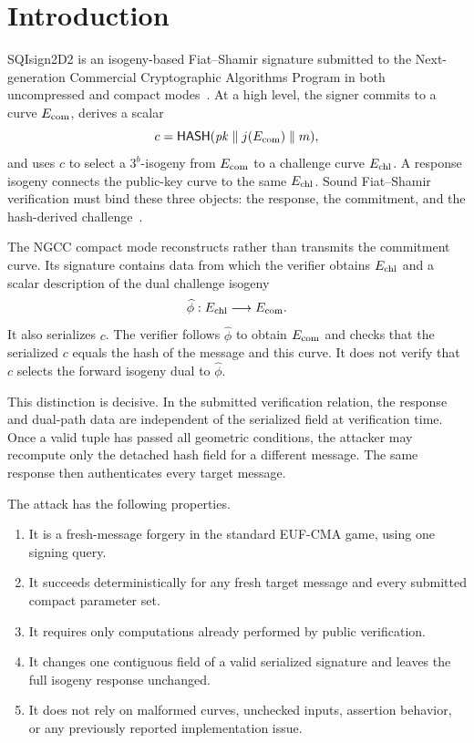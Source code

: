 \documentclass[11pt,a4paper]{article}
\newcommand{\Hash}{\mathsf{HASH}}
\begin{document}
\section{Introduction}

SQIsign2D2 is an isogeny-based Fiat--Shamir signature submitted to the
Next-generation Commercial Cryptographic Algorithms Program in both uncompressed and compact
modes~\cite{sqisign2d2-spec}.  At a high level, the signer
commits to a curve $E_{\rm com}$, derives a scalar
\[
  c=\Hash(\mathit{pk}\parallel j(E_{\rm com})\parallel m),
\]
and uses $c$ to select a $3^b$-isogeny from $E_{\rm com}$ to a challenge curve
$E_{\rm chl}$.  A response isogeny connects the public-key curve to the same
$E_{\rm chl}$.  Sound Fiat--Shamir verification must bind these three objects: the response,
the commitment, and the hash-derived challenge~\cite{fiat-shamir}.

The NGCC compact mode reconstructs rather than transmits the commitment curve.  Its signature
contains data from which the verifier obtains $E_{\rm chl}$ and a scalar description of the
dual challenge isogeny
\[
  \widehat\phi:E_{\rm chl}\longrightarrow E_{\rm com}.
\]
It also serializes $c$.  The verifier follows $\widehat\phi$ to obtain $E_{\rm com}$ and checks
that the serialized $c$ equals the hash of the message and this curve.  It does not verify that
$c$ selects the forward isogeny dual to $\widehat\phi$.

This distinction is decisive.  In the submitted verification relation, the response and dual-path data are independent of the
serialized field at verification time.  Once a valid tuple has passed all geometric conditions,
the attacker may recompute only the detached hash field for a different message.  The same
response then authenticates every target message.

The attack has the following properties.
\begin{enumerate}[leftmargin=1.7em]
  \item It is a fresh-message forgery in the standard EUF-CMA game, using one signing query.
  \item It succeeds deterministically for any fresh target message and every submitted
        compact parameter set.
  \item It requires only computations already performed by public verification.
  \item It changes one contiguous field of a valid serialized signature and leaves the full
        isogeny response unchanged.
  \item It does not rely on malformed curves, unchecked inputs, assertion behavior, or any
        previously reported implementation issue.
\end{enumerate}
\end{document}
